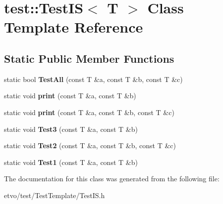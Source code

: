 \hypertarget{classtest_1_1_test_i_s}{}\section{test\+:\+:Test\+IS$<$ T $>$ Class Template Reference}
\label{classtest_1_1_test_i_s}
\subsection*{Static Public Member Functions}
\begin{DoxyCompactItemize}
\item 
\mbox{\label{classtest_1_1_test_i_s_aa0ee864672dd78ad0778ff450d979a4a}} 
static bool {\bfseries Test\+All} (const T \&a, const T \&b, const T \&c)
\item 
\mbox{\label{classtest_1_1_test_i_s_adba68d4fe4f91ee465e662ec6939aa60}} 
static void {\bfseries print} (const T \&a, const T \&b)
\item 
\mbox{\label{classtest_1_1_test_i_s_a0cff96e5b9e87c82ced013f9a45e780a}} 
static void {\bfseries print} (const T \&a, const T \&b, const T \&c)
\item 
\mbox{\label{classtest_1_1_test_i_s_a0a3d6f076ab302ddb247f957df47e49f}} 
static void {\bfseries Test3} (const T \&a, const T \&b)
\item 
\mbox{\label{classtest_1_1_test_i_s_aca6ce7bc92e31a738f20f9c4b8c109ae}} 
static void {\bfseries Test2} (const T \&a, const T \&b, const T \&c)
\item 
\mbox{\label{classtest_1_1_test_i_s_a0d74db6c2f7566d7a548b18d0a59428c}} 
static void {\bfseries Test1} (const T \&a, const T \&b)
\end{DoxyCompactItemize}


The documentation for this class was generated from the following file\+:\begin{DoxyCompactItemize}
\item 
etvo/test/\+Test\+Template/Test\+I\+S.\+h\end{DoxyCompactItemize}
